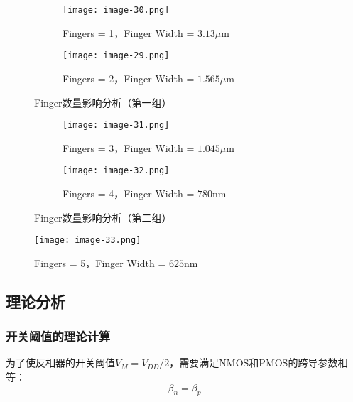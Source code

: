 \documentclass[UTF8,12pt,a4paper]{ctexart}
\begin{document}
\begin{figure}[htbp]
    \centering
    \begin{subfigure}[b]{0.45\textwidth} %
        \centering
        \texttt{[image: image-30.png]} 
        \caption{Fingers = 1，Finger Width = $3.13\mu$m}
        \label{fig:task9i}
    \end{subfigure}
    \hfill %
    \begin{subfigure}[b]{0.45\textwidth}
        \centering
        \texttt{[image: image-29.png]} 
        \caption{Fingers = 2，Finger Width = $1.565\mu$m}
        \label{fig:task9j}
    \end{subfigure}
    \label{fig:task9ij}
    \caption{Finger数量影响分析（第一组）}
\end{figure}


\begin{figure}[htbp]
    \centering
    \begin{subfigure}[b]{0.45\textwidth} %
        \centering
        \texttt{[image: image-31.png]} 
        \caption{Fingers = 3，Finger Width = $1.045\mu$m}
        \label{fig:task9k}
    \end{subfigure}
    \hfill %
    \begin{subfigure}[b]{0.45\textwidth}
        \centering
        \texttt{[image: image-32.png]} 
        \caption{Fingers = 4，Finger Width = $780$nm}
        \label{fig:task9l}
    \end{subfigure}
    \label{fig:task9kl}
    \caption{Finger数量影响分析（第二组）}
\end{figure}

\begin{figure}[h]
\centering
\texttt{[image: image-33.png]}
\caption{Fingers = 5，Finger Width = $625$nm}
\label{fig:task9m}
\end{figure}

\subsection{理论分析}

\subsubsection{开关阈值的理论计算}
为了使反相器的开关阈值$V_M = V_{DD}/2$，需要满足NMOS和PMOS的跨导参数相等：
\begin{equation}
\beta_n = \beta_p
\end{equation}
\end{document}
